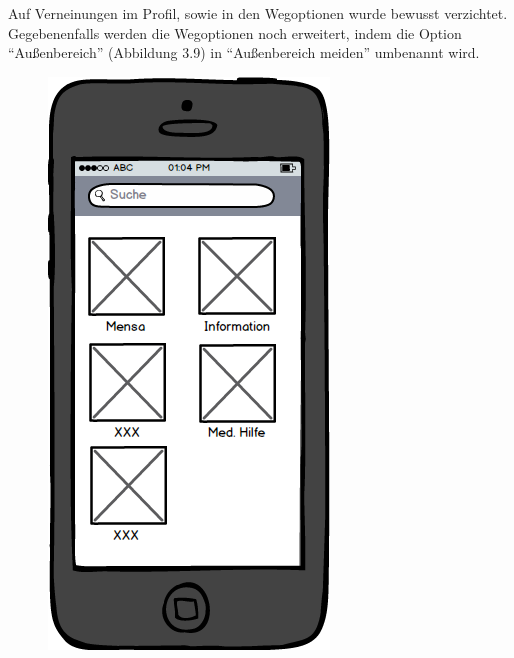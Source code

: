 Auf Verneinungen im Profil, sowie in den Wegoptionen wurde bewusst verzichtet. Gegebenenfalls werden die Wegoptionen noch erweitert, indem die Option "`Außenbereich"' (Abbildung 3.9) in "`Außenbereich meiden"' umbenannt wird.

\begin{figure}[ht]
\centering
\begin{minipage}[b]{.5\textwidth}
  \centering
  \includegraphics[width=.8\linewidth]{img/menu-mockup.png}
  \label{img:menu-mockup}
\end{minipage}%
\begin{minipage}[b]{.5\textwidth}
  \centering

\end{minipage}
\end{figure}
